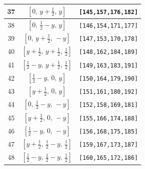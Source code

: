 \documentclass[fleqn,8pt]{jsarticle}
\begin{document}
\begin{longtable}{ccc}
37 & $\left[ 0,\, y + \frac{1}{2},\, y \right]$ & {\tt [145,157,176,182]} \\ \hline
38 & $\left[ 0,\, \frac{1}{2} - y,\, y \right]$ & {\tt [146,154,171,177]} \\ \hline
39 & $\left[ 0,\, y + \frac{1}{2},\, - y \right]$ & {\tt [147,153,170,178]} \\ \hline
40 & $\left[ y + \frac{1}{2},\, y + \frac{1}{2},\, \frac{1}{2} \right]$ & {\tt [148,162,184,189]} \\ \hline
41 & $\left[ \frac{1}{2} - y,\, y + \frac{1}{2},\, \frac{1}{2} \right]$ & {\tt [149,163,183,191]} \\ \hline
42 & $\left[ \frac{1}{2} - y,\, 0,\, y \right]$ & {\tt [150,164,179,190]} \\ \hline
43 & $\left[ y + \frac{1}{2},\, 0,\, y \right]$ & {\tt [151,161,180,192]} \\ \hline
44 & $\left[ 0,\, \frac{1}{2} - y,\, - y \right]$ & {\tt [152,158,169,181]} \\ \hline
45 & $\left[ y + \frac{1}{2},\, 0,\, - y \right]$ & {\tt [155,166,174,188]} \\ \hline
46 & $\left[ \frac{1}{2} - y,\, 0,\, - y \right]$ & {\tt [156,168,175,185]} \\ \hline
47 & $\left[ y + \frac{1}{2},\, \frac{1}{2} - y,\, \frac{1}{2} \right]$ & {\tt [159,167,173,187]} \\ \hline
48 & $\left[ \frac{1}{2} - y,\, \frac{1}{2} - y,\, \frac{1}{2} \right]$ & {\tt [160,165,172,186]} \\
\end{longtable}
\renewcommand{\arraystretch}{1.2}
\end{document}
